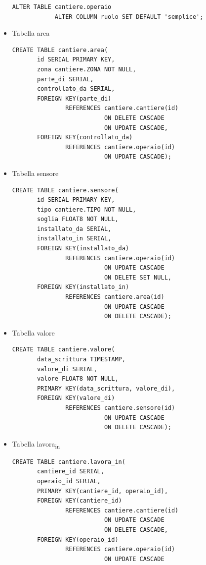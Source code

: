\documentclass[11pt]{article}
\begin{document}
\begin{itemize}
\begin{verbatim}
ALTER TABLE cantiere.operaio
            ALTER COLUMN ruolo SET DEFAULT 'semplice';
\end{verbatim}
\item Tabella area
\label{sec:orgdb3decd}
\begin{verbatim}
CREATE TABLE cantiere.area(
       id SERIAL PRIMARY KEY,
       zona cantiere.ZONA NOT NULL,
       parte_di SERIAL,
       controllato_da SERIAL,
       FOREIGN KEY(parte_di)
               REFERENCES cantiere.cantiere(id)
                          ON DELETE CASCADE
                          ON UPDATE CASCADE,
       FOREIGN KEY(controllato_da)
               REFERENCES cantiere.operaio(id)
                          ON UPDATE CASCADE);
\end{verbatim}
\item Tabella sensore
\label{sec:org12625cf}
\begin{verbatim}
CREATE TABLE cantiere.sensore(
       id SERIAL PRIMARY KEY,
       tipo cantiere.TIPO NOT NULL,
       soglia FLOAT8 NOT NULL,
       installato_da SERIAL,
       installato_in SERIAL,
       FOREIGN KEY(installato_da)
               REFERENCES cantiere.operaio(id)
                          ON UPDATE CASCADE
                          ON DELETE SET NULL,
       FOREIGN KEY(installato_in)
               REFERENCES cantiere.area(id)
                          ON UPDATE CASCADE
                          ON DELETE CASCADE);
\end{verbatim}
\item Tabella valore
\label{sec:orgdd210f2}
\begin{verbatim}
CREATE TABLE cantiere.valore(
       data_scrittura TIMESTAMP,
       valore_di SERIAL,
       valore FLOAT8 NOT NULL,
       PRIMARY KEY(data_scrittura, valore_di),
       FOREIGN KEY(valore_di)
               REFERENCES cantiere.sensore(id)
                          ON UPDATE CASCADE
                          ON DELETE CASCADE);
\end{verbatim}
\item Tabella lavora\textsubscript{in}
\label{sec:org96f7bd3}
\begin{verbatim}
CREATE TABLE cantiere.lavora_in(
       cantiere_id SERIAL,
       operaio_id SERIAL,
       PRIMARY KEY(cantiere_id, operaio_id),
       FOREIGN KEY(cantiere_id)
               REFERENCES cantiere.cantiere(id)
                          ON UPDATE CASCADE
                          ON DELETE CASCADE,
       FOREIGN KEY(operaio_id)
               REFERENCES cantiere.operaio(id)
                          ON UPDATE CASCADE

\end{verbatim}
\end{itemize}
\end{document}

